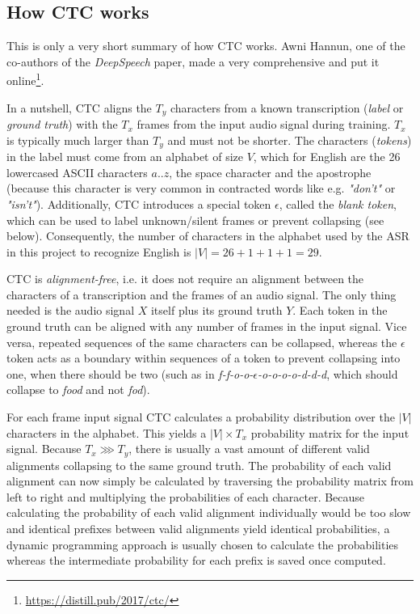 \subsection{How \ac{CTC} works}
\label{ctc-summary}

This is only a very short summary of how \ac{CTC} works. Awni Hannun, one of the co-authors of the \textit{DeepSpeech} paper, made a very comprehensive and put it online\footnote{\url{https://distill.pub/2017/ctc/}}.

In a nutshell, \ac{CTC} aligns the $T_y$ characters from a known transcription (\textit{label} or \textit{ground truth}) with the $T_x$ frames from the input audio signal during training. $T_x$ is typically much larger than $T_y$ and must not be shorter. The characters (\textit{tokens}) in the label must come from an alphabet of size $V$, which for English are the 26 lowercased ASCII characters $a..z$, the space character and the apostrophe (because this character is very common in contracted words like e.g. \textit{"don't"} or \textit{"isn't"}). Additionally, \ac{CTC} introduces a special token $\epsilon$, called the \textit{blank token}, which can be used to label unknown/silent frames or prevent collapsing (see below). Consequently, the number of characters in the alphabet used by the \ac{ASR} in this project to recognize English is $|V|=26+1+1+1=29$.

\ac{CTC} is \textit{alignment-free}, i.e. it does not require an alignment between the characters of a transcription and the frames of an audio signal. The only thing needed is the audio signal $X$ itself plus its ground truth $Y$. Each token in the ground truth can be aligned with any number of frames in the input signal. Vice versa, repeated sequences of the same characters can be collapsed, whereas the $\epsilon$ token acts as a boundary within sequences of a token to prevent collapsing into one, when there should be two (such as in \textit{f-f-o-o-$\epsilon$-o-o-o-o-d-d-d}, which should collapse to \textit{food} and not \textit{fod}). 

For each frame input signal \ac{CTC} calculates a probability distribution over the $|V|$ characters in the alphabet. This yields a $|V| \times T_x$ probability matrix for the input signal. Because $T_x \ggg T_y$, there is usually a vast amount of different valid alignments collapsing to the same ground truth. The probability of each valid alignment can now simply be calculated by traversing the probability matrix from left to right and multiplying the probabilities of each character. Because calculating the probability of each valid alignment individually would be too slow and identical prefixes between valid alignments yield identical probabilities, a dynamic programming approach is usually chosen to calculate the probabilities whereas the intermediate probability for each prefix is saved once computed.

